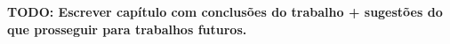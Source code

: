 \documentclass[12pt,
openright, 
oneside, %
a4paper,    %
brazil]{facom-ufu-abntex2}
\begin{document}

\textbf{TODO: Escrever capítulo com conclusões do trabalho + sugestões do que prosseguir para trabalhos futuros.}











\postextual








  



\end{document}
